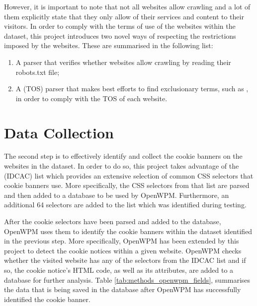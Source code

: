 \documentclass[../main.tex]{subfiles}
\begin{document}
However, it is important to note that not all websites allow crawling and a lot of them explicitly state that they only allow  of their services and content to their visitors. In order to comply with the terms of use of the websites within the dataset, this project introduces two novel ways of respecting the restrictions imposed by the websites. These are summarised in the following list:

\begin{enumerate}
    \item A  parser that verifies whether websites allow crawling by reading their robots.txt file;
    
    \item A  (TOS) parser that makes best efforts to find exclusionary terms, such as , in order to comply with the TOS of each website.
\end{enumerate}

\section{Data Collection}
The second step is to effectively identify and collect the cookie banners on the websites in the dataset. In order to do so, this project takes advantage of the  (IDCAC) list which provides an extensive selection of common CSS selectors that cookie banners use. More specifically, the CSS selectors from that list are parsed and then added to a database to be used by OpenWPM. Furthermore, an additional 64 selectors are added to the list which was identified during testing.

After the cookie selectors have been parsed and added to the database, OpenWPM uses them to identify the cookie banners within the dataset identified in the previous step. More specifically, OpenWPM has been extended by this project to detect the cookie notices within a given website. OpenWPM checks whether the visited website has any of the selectors from the IDCAC list and if so, the cookie notice’s HTML code, as well as its attributes, are added to a database for further analysis. Table \ref{tab:methods_openwpm_fields}, summarises the data that is being saved in the database after OpenWPM has successfully identified the cookie banner. 
\end{document}
